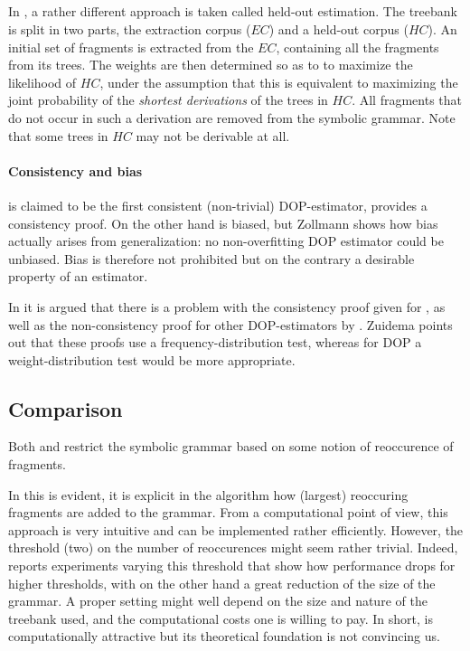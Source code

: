 \subsection{\dops}
In \dops \cite{zollmann2005}, a rather different approach is taken called held-out estimation. The treebank is split in two parts, the extraction corpus ($EC$) and a held-out corpus ($HC$). An initial set of fragments is extracted from the $EC$, containing all the fragments from its trees. The weights are then determined so as to to maximize the likelihood of $HC$, under the assumption that this is equivalent to maximizing the joint probability of the \emph{shortest derivations} of the trees in $HC$. All fragments that do not occur in such a derivation are removed from the symbolic grammar. Note that some trees in $HC$ may not be derivable at all. 

\paragraph{Consistency and bias}
\dops is claimed to be the first consistent (non-trivial) DOP-estimator, \cite{zollmann2005} provides a consistency proof. On the other hand \dops{} is  biased, but Zollmann shows how bias actually arises from generalization: no non-overfitting DOP estimator could be unbiased. Bias is therefore not prohibited but on the contrary a desirable property of an estimator.

In \cite{zuidema2006} it is argued that there is a problem with the consistency proof given for \dops{}, as well as the non-consistency proof for other DOP-estimators by \cite{johnson2002}. Zuidema points out that these proofs use a frequency-distribution test, whereas for DOP a weight-distribution test would be more appropriate. 


\subsection{Comparison}
Both \dops{} and \ddop{} restrict the symbolic grammar based on some notion of reoccurence of fragments. 

In \ddop{} this is evident, it is explicit in the algorithm how (largest) reoccuring fragments are added to the grammar. From a computational point of view, this approach is very intuitive and can be implemented rather efficiently. However, the threshold (two) on the number of reoccurences might seem rather trivial. Indeed, \cite{sangati2011} reports experiments varying this threshold that show how performance drops for higher thresholds, with on the other hand a great reduction of the size of the grammar. A proper setting might well depend on the size and nature of the treebank used, and the computational costs one is willing to pay. In short, \ddop{} is computationally attractive but its theoretical foundation is not convincing us.


